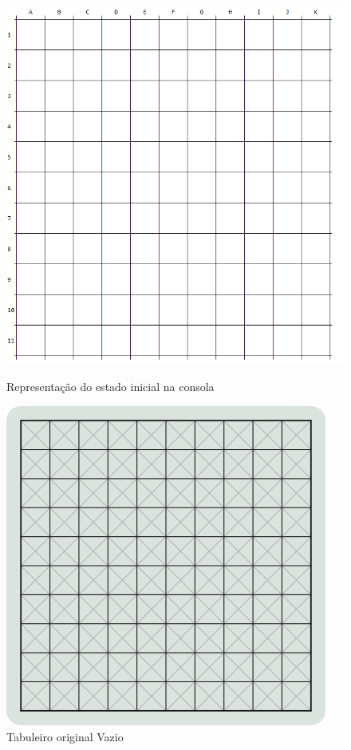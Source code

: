 \documentclass[a4paper]{article}
\begin{document}
\begin{figure}[h!]
\centering
\begin{minipage}{.35\textwidth}
	\centering
	\includegraphics[width=\textwidth]{images/self_empty_board.png}
	\caption{Representação do estado inicial na consola}
	\label{Figura 4}
\end{minipage}
\quad \quad
\begin{minipage}{.35\textwidth}
	\centering
	\includegraphics[width=\textwidth]{images/fabrik_empty_board.png}
	\caption{Tabuleiro original Vazio}
	\label{Figura 5}
\end{minipage}
\end{figure}
\end{document}
